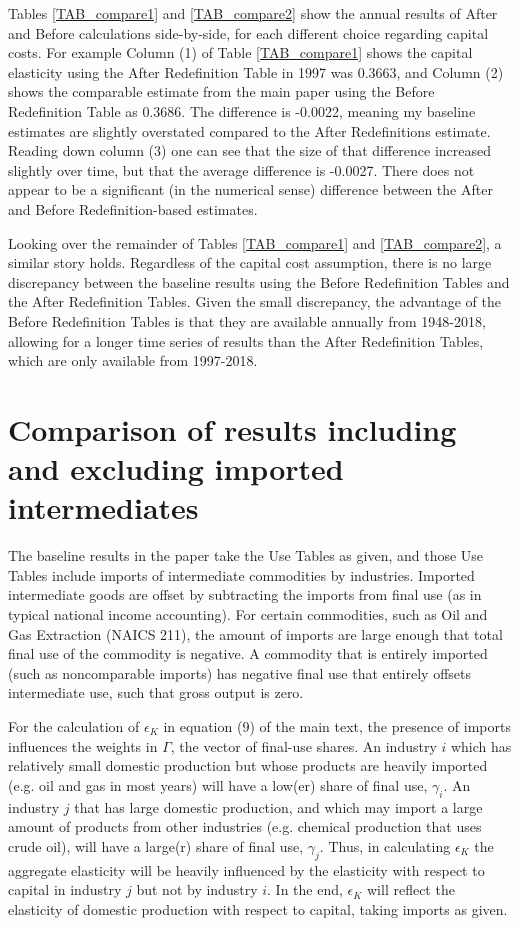 \documentclass[11pt]{article}
\begin{document}
Tables \ref{TAB_compare1} and \ref{TAB_compare2} show the annual results of After and Before calculations side-by-side, for each different choice regarding capital costs. For example Column (1) of Table \ref{TAB_compare1} shows the capital elasticity using the After Redefinition Table in 1997 was 0.3663, and Column (2) shows the comparable estimate from the main paper using the Before Redefinition Table as 0.3686. The difference is -0.0022, meaning my baseline estimates are slightly overstated compared to the After Redefinitions estimate. Reading down column (3) one can see that the size of that difference increased slightly over time, but that the average difference is -0.0027. There does not appear to be a significant (in the numerical sense) difference between the After and Before Redefinition-based estimates.

Looking over the remainder of Tables \ref{TAB_compare1} and \ref{TAB_compare2}, a similar story holds. Regardless of the capital cost assumption, there is no large discrepancy between the baseline results using the Before Redefinition Tables and the After Redefinition Tables. Given the small discrepancy, the advantage of the Before Redefinition Tables is that they are available annually from 1948-2018, allowing for a longer time series of results than the After Redefinition Tables, which are only available from 1997-2018. 

\section{Comparison of results including and excluding imported intermediates}
The baseline results in the paper take the Use Tables as given, and those Use Tables include imports of intermediate commodities by industries. Imported intermediate goods are offset by subtracting the imports from final use (as in typical national income accounting). For certain commodities, such as Oil and Gas Extraction (NAICS 211), the amount of imports are large enough that total final use of the commodity is negative. A commodity that is entirely imported (such as noncomparable imports) has negative final use that entirely offsets intermediate use, such that gross output is zero. 

For the calculation of $\epsilon_K$ in equation (9) of the main text, the presence of imports influences the weights in $\Gamma$, the vector of final-use shares. An industry $i$ which has relatively small domestic production but whose products are heavily imported (e.g. oil and gas in most years) will have a low(er) share of final use, $\gamma_i$. An industry $j$ that has large domestic production, and which may import a large amount of products from other industries (e.g. chemical production that uses crude oil), will have a large(r) share of final use, $\gamma_j$. Thus, in calculating $\epsilon_K$ the aggregate elasticity will be heavily influenced by the elasticity with respect to capital in industry $j$ but not by industry $i$. In the end, $\epsilon_K$ will reflect the elasticity of domestic production with respect to capital, taking imports as given. 
\end{document}
